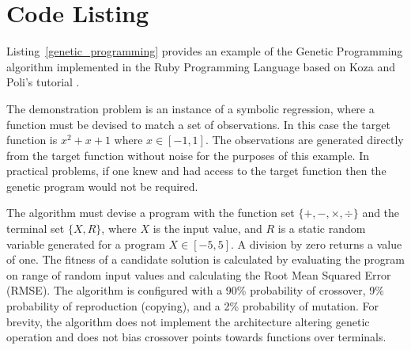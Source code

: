 \documentclass[a4paper, 11pt]{article}
\begin{document}
\section{Code Listing}
\label{sec:code}
Listing~\ref{genetic_programming} provides an example of the Genetic Programming algorithm implemented in the Ruby Programming Language based on Koza and Poli's tutorial \cite{Koza2003a}.
 
The demonstration problem is an instance of a symbolic regression, where a function must be devised to match a set of observations. In this case the target function is $x^2+x+1$ where $x \in [-1,1]$. The observations are generated directly from the target function without noise for the purposes of this example. In practical problems, if one knew and had access to the target function then the genetic program would not be required.

The algorithm must devise a program with the function set $\{ +, -, \times, \div \}$ and the terminal set $\{ X, R \}$, where $X$ is the input value, and $R$ is a static random variable generated for a program $X \in [-5,5]$. A division by zero returns a value of one. 
The fitness of a candidate solution is calculated by evaluating the program on range of random input values and calculating the Root Mean Squared Error (RMSE).
The algorithm is configured with a 90\% probability of crossover, 9\% probability of reproduction (copying), and a 2\% probability of mutation.
For brevity, the algorithm does not implement the architecture altering genetic operation and does not bias crossover points towards functions over terminals.


\end{document}
